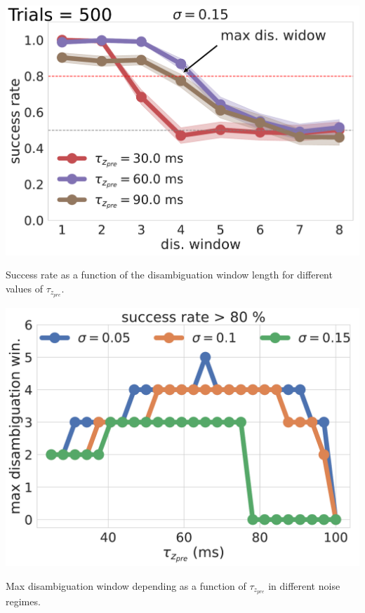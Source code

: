 \documentclass[portrait ,a4, final]{baposter}
\begin{document}
\begin{poster}
{\begin{multicols}{2}
\begin{center}
\includegraphics[scale=0.20]{noise2.pdf}

\smaller Success rate as a function of the disambiguation window length for different values of $\tau_{z_{pre}}$.
\end{center}

\begin{center}
\includegraphics[scale=0.20]{noise.pdf}

\smaller Max disambiguation window depending as a function of $\tau_{z_{pre}}$ in different noise regimes. 
\end{center}

\end{multicols}


}
\end{poster}
\end{document}
